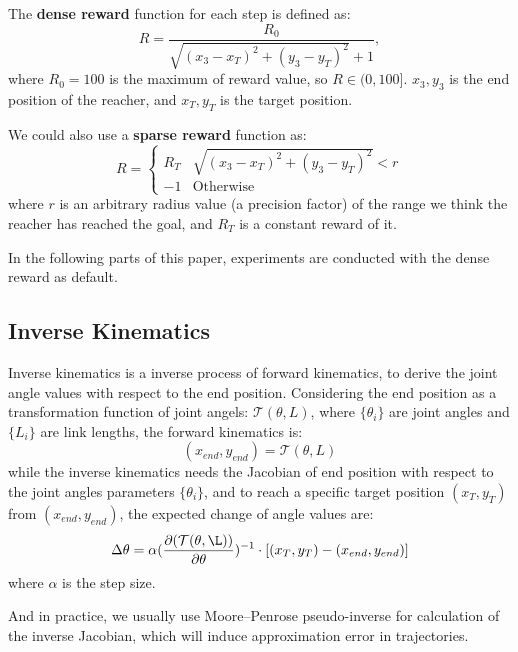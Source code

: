 \documentclass{article}
\begin{document}
The \textbf{dense reward} function for each step is defined as:
\begin{equation}
\label{equ:dense_reward}
 R=\frac{R_0}{\sqrt{(x_3-x_T)^2+(y_3-y_T)^2}+1}, 
\end{equation}
where $R_0=100$ is the maximum of reward value, so $R\in(0,100]$. $x_3, y_3$ is the end position of the reacher, and $x_T, y_T$ is the target position.

We could also use a \textbf{sparse reward} function as:
\begin{equation}
    R =
\begin{cases}
R_T& \sqrt{(x_3-x_T)^2+(y_3-y_T)^2}<r\\
-1& \text{Otherwise}
\end{cases}
\end{equation}
where $r$ is an arbitrary radius value (a precision factor) of the range we think the reacher has reached the goal, and $R_T$ is a constant reward of it.

In the following parts of this paper, experiments are conducted with the dense reward as default.

\subsection{Inverse Kinematics}
Inverse kinematics is a inverse process of forward kinematics, to derive the joint angle values with respect to the end position. Considering the end position as a transformation function of joint angels: $\mathcal{T}(\theta, L)$, where $\{\theta_i\}$ are joint angles and $\{L_i\}$ are link lengths, the forward kinematics is:
\begin{equation}
 (x_{end}, y_{end}) = \mathcal{T}(\theta, L)
\end{equation}
while the inverse kinematics needs the Jacobian of end position with respect to the joint angles parameters $\{\theta_i\}$, and to reach a specific target position $(x_T, y_T)$ from $(x_{end}, y_{end})$, the expected change of angle values are:
\begin{equation}
	\Delta \theta = \alpha (\frac{\partial(\mathcal{T}(\theta, \L))}{\partial \theta})^{-1} \cdot [(x_T, y_T)-(x_{end}, y_{end})]
\end{equation}
where $\alpha$ is the step size. 

And in practice, we usually use Moore–Penrose pseudo-inverse for calculation of the inverse Jacobian, which will induce approximation error in trajectories.
\end{document}
